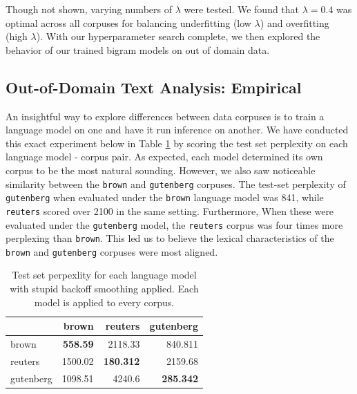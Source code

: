\documentclass[11pt,a4paper]{article}
\begin{document}

Though not shown, varying numbers of $\lambda$ were tested. We found that $\lambda = 0.4$ was optimal across all corpuses for
balancing underfitting (low $\lambda$) and overfitting (high $\lambda$). With our hyperparameter search complete, we 
then explored the behavior of our trained bigram models on out of domain data.


\subsection{Out-of-Domain Text Analysis: Empirical}%
\label{sec:out_domain_text_analysis_empirical}

An insightful way to explore differences between data corpuses is to train a language model on 
one and have it run inference on another. We have conducted this exact experiment below in Table \ref{table:backoff_test_perp} by scoring
the test set perplexity on each language model - corpus pair. As expected, each model determined its own corpus to be the most natural sounding.
However, we also saw noticeable similarity between the \texttt{brown} and \texttt{gutenberg} corpuses. The test-set perplexity of \texttt{gutenberg} 
when evaluated under the \texttt{brown} language model was 841, while \texttt{reuters} scored over 2100 in the same setting. Furthermore,
When these were evaluated under the \texttt{gutenberg} model, the \texttt{reuters} corpus was four times more perplexing than \texttt{brown}.
This led us to believe the lexical characteristics of the \texttt{brown} and \texttt{gutenberg} corpuses were most aligned.

\begin{table}[h]
\begin{tabular}{lrrr}
\hline
           &   brown &   reuters &   gutenberg \\
\hline
 brown     &  \textbf{ 558.59 } &  2118.33  &     840.811 \\
 reuters   & 1500.02 &   \textbf{ 180.312 } &    2159.68  \\
 gutenberg & 1098.51 &  4240.6   &     \textbf{ 285.342 } \\
\hline
\end{tabular}
\caption{Test set perpexlity for each language model with
  stupid backoff smoothing applied. Each model is applied to 
every corpus.}
\vspace{-10pt}
\label{table:backoff_test_perp}
\end{table}
\end{document}

